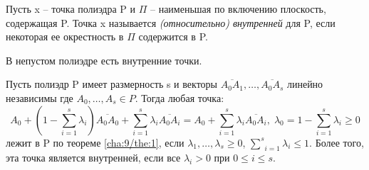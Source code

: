 \begin{definition}\label{cha:9/def:3}
	Пусть x – точка полиэдра P и $\Pi$ – наименьшая по включению плоскость, содержащая P. Точка x называется \textit{(относительно) внутренней} для P, если некоторая ее окрестность в $\Pi$ содержится в P.
\end{definition}

\begin{theorem}[]\label{cha:9/the:2}
	В непустом полиэдре есть внутренние точки.
\end{theorem}
\begin{Proof}
	Пусть полиэдр P имеет размерность s и векторы $\overline{A_0 A_1}, \dots, \overline{A_0 A_s}$ линейно независимы где $A_0, \dots, A_s \in P$. Тогда любая точка:
	$$A_0 + \left( 1 - \underset{i=1}{\overset{s}{\sum}}\lambda_i \right) \overline{A_0 A_0} + \underset{i=1}{\overset{s}{\sum}} \lambda_i \overline{A_0 A_i} = A_0 + \underset{i=1}{\overset{s}{\sum}}\lambda_i \overline{A_0 A_i}, \; \lambda_0 = 1 - \underset{i=1}{\overset{s}{\sum}}\lambda_i \ge 0$$
	лежит в P по теореме \ref{cha:9/the:1}, если $\lambda_1, \dots, \lambda_s \ge 0$, $\underset{i=1}{\overset{s}{\sum}} \lambda_i \le 1$. Более того, эта точка является внутренней, если все $\lambda_i > 0$ при $0 \le i \le s$.
\end{Proof}
